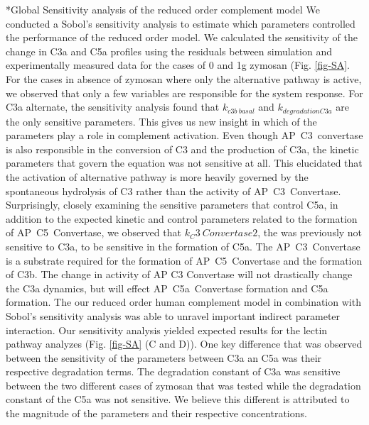 \documentclass[12pt]{article}
\makeatletter
\renewcommand\subsection{\@startsection
	{subsection}{2}{0mm}
	{-0.05in}
	{-0.5\baselineskip}
	{\normalfont\normalsize\bfseries}}
\makeatother
\begin{document}
\subsection*{Global Sensitivity analysis of the reduced order complement model}
We conducted a Sobol's sensitivity analysis to estimate which parameters controlled the performance of the reduced order model. We calculated the sensitivity of the change in C3a and C5a profiles using the residuals between simulation and experimentally measured data for the cases of 0 and 1g zymosan (Fig. \ref{fig-SA}.
For the cases in absence of zymosan where only the alternative pathway is active, we observed that only a few variables are responsible for the system response. For C3a alternate, the sensitivity analysis found that $k_{c3b~basal}$ and $k_{degradationC3a}$ are the only sensitive parameters. This gives us new insight in which of the parameters play a role in complement activation. Even though AP~C3~convertase is also responsible in the conversion of C3 and the production of C3a, the kinetic parameters that govern the equation was not sensitive at all. This elucidated that the activation of alternative pathway is more heavily governed by the spontaneous hydrolysis of C3 rather than the activity of AP~C3~Convertase. Surprisingly, closely examining the sensitive parameters that control C5a, in addition to the expected kinetic and control parameters related to the formation of AP~C5~Convertase, we observed that $k_C3~Convertase2$, the was previously not sensitive to C3a, to be sensitive in the formation of C5a. The AP~C3~Convertase is a substrate required for the formation of AP~C5~Convertase and the formation of C3b. The change in activity of AP C3 Convertase  will not drastically change the C3a dynamics, but will effect AP~C5a~Convertase formation and C5a formation.
The our reduced order human complement model in combination with Sobol's sensitivity analysis was able to unravel important indirect parameter interaction.
Our sensitivity analysis yielded expected results for the lectin pathway analyzes (Fig. \ref{fig-SA} (C and D)). One key difference that was observed between the sensitivity of the parameters between C3a an C5a was their respective degradation terms. The degradation constant of C3a was sensitive between the two different cases of zymosan that was tested while the degradation constant of the C5a was not sensitive. We believe this different is attributed to the magnitude of the parameters and their respective concentrations.

\clearpage
\end{document}
